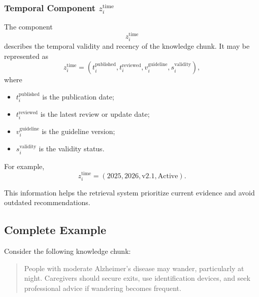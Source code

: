 \documentclass{article}
\begin{document}
\subsubsection{Temporal Component $z_i^{\mathrm{time}}$}

The component
\begin{equation}
    z_i^{\mathrm{time}}
\end{equation}
describes the temporal validity and recency of the knowledge chunk.
It may be represented as
\begin{equation}
    z_i^{\mathrm{time}}
    =
    \left(
    t_i^{\mathrm{published}},
    t_i^{\mathrm{reviewed}},
    v_i^{\mathrm{guideline}},
    s_i^{\mathrm{validity}}
    \right),
\end{equation}
where
\begin{itemize}
    \item $t_i^{\mathrm{published}}$ is the publication date;
    \item $t_i^{\mathrm{reviewed}}$ is the latest review or update date;
    \item $v_i^{\mathrm{guideline}}$ is the guideline version;
    \item $s_i^{\mathrm{validity}}$ is the validity status.
\end{itemize}
For example,
\begin{equation}
    z_i^{\mathrm{time}}
    =
    \left(
    2025,
    2026,
    \mathrm{v2.1},
    \mathrm{Active}
    \right).
\end{equation}

This information helps the retrieval system prioritize current evidence and avoid outdated recommendations.

\subsection{Complete Example}
Consider the following knowledge chunk:
\begin{quote}
People with moderate Alzheimer's disease may wander, particularly at night.
Caregivers should secure exits, use identification devices, and seek
professional advice if wandering becomes frequent.
\end{quote}
\end{document}
